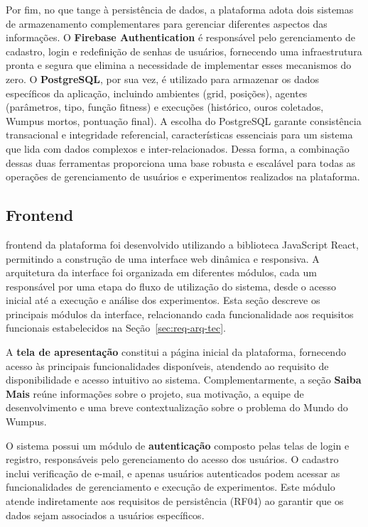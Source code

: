 Por fim, no que tange à persistência de dados, a plataforma adota dois sistemas de armazenamento complementares para gerenciar diferentes aspectos das informações. O \textbf{Firebase Authentication} é responsável pelo gerenciamento de cadastro, login e redefinição de senhas de usuários, fornecendo uma infraestrutura pronta e segura que elimina a necessidade de implementar esses mecanismos do zero. O \textbf{PostgreSQL}, por sua vez, é utilizado para armazenar os dados específicos da aplicação, incluindo ambientes (grid, posições), agentes (parâmetros, tipo, função fitness) e execuções (histórico, ouros coletados, Wumpus mortos, pontuação final). A escolha do PostgreSQL garante consistência transacional e integridade referencial, características essenciais para um sistema que lida com dados complexos e inter-relacionados. Dessa forma, a combinação dessas duas ferramentas proporciona uma base robusta e escalável para todas as operações de gerenciamento de usuários e experimentos realizados na plataforma.

\subsection{Frontend}

frontend da plataforma foi desenvolvido utilizando a biblioteca JavaScript React, permitindo a construção de uma interface web dinâmica e responsiva. A arquitetura da interface foi organizada em diferentes módulos, cada um responsável por uma etapa do fluxo de utilização do sistema, desde o acesso inicial até a execução e análise dos experimentos. Esta seção descreve os principais módulos da interface, relacionando cada funcionalidade aos requisitos funcionais estabelecidos na Seção~\ref{sec:req-arq-tec}.

A \textbf{tela de apresentação} constitui a página inicial da plataforma, fornecendo acesso às principais funcionalidades disponíveis, atendendo ao requisito de disponibilidade e acesso intuitivo ao sistema. Complementarmente, a seção \textbf{Saiba Mais} reúne informações sobre o projeto, sua motivação, a equipe de desenvolvimento e uma breve contextualização sobre o problema do Mundo do Wumpus.

O sistema possui um módulo de \textbf{autenticação} composto pelas telas de login e registro, responsáveis pelo gerenciamento do acesso dos usuários. O cadastro inclui verificação de e-mail, e apenas usuários autenticados podem acessar as funcionalidades de gerenciamento e execução de experimentos. Este módulo atende indiretamente aos requisitos de persistência (RF04) ao garantir que os dados sejam associados a usuários específicos.

